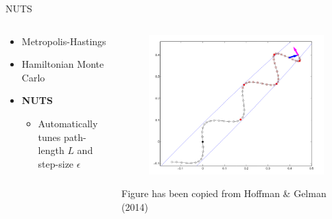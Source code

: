 \documentclass{beamer}
\begin{document}
\begin{frame}{NUTS}
\begin{columns}
\begin{column}{0.5\textwidth}
    \begin{itemize}
    \color{gray}
        \item Metropolis-Hastings
        \item Hamiltonian Monte Carlo
        \color{black}
        \item \textbf{NUTS}
        \begin{itemize}
            \item Automatically tunes path-length $L$ and step-size $\epsilon$
        \end{itemize}
    \end{itemize}
\end{column}
\begin{column}{0.5\textwidth}
\begin{figure}
    \centering
    \includegraphics[width=\linewidth]{Screenshot_2020-07-13 Hoffman_Gelman_NUTS pdf.png}
\end{figure}
\footnotesize
Figure has been copied from Hoffman \& Gelman (2014) \cite{hoffman2014no}

\end{column}
\end{columns}
\end{frame}
\end{document}
